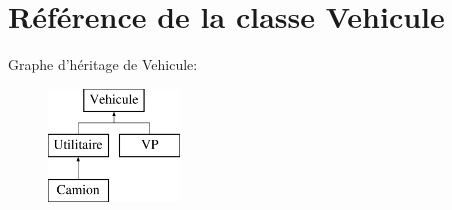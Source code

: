 \hypertarget{class_vehicule}{
\section{Référence de la classe Vehicule}
\label{class_vehicule}
}
Graphe d'héritage de Vehicule:\begin{figure}[H]
\begin{center}
\leavevmode
\includegraphics[height=3.000000cm]{class_vehicule}
\end{center}
\end{figure}
